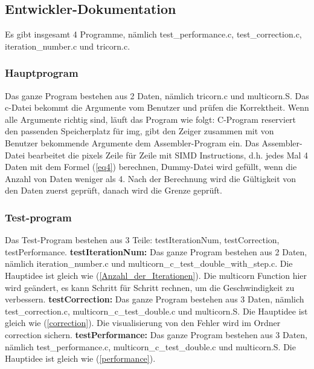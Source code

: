 \documentclass[course=erap]{aspdoc}
\begin{document}
\subsection{Entwickler-Dokumentation}
Es gibt insgesamt 4 Programme, nämlich test\_performance.c, test\_correction.c, iteration\_number.c und tricorn.c.
\subsubsection{Hauptprogram}
Das ganze Program bestehen aus 2 Daten, nämlich tricorn.c und multicorn.S. Das c-Datei bekommt die Argumente vom Benutzer und prüfen die Korrektheit. Wenn alle Argumente richtig sind, läuft das Program wie folgt: \newline
C-Program reserviert den passenden Speicherplatz für img, gibt den Zeiger zusammen mit von Benutzer bekommende Argumente dem Assembler-Program ein. Das Assembler-Datei bearbeitet die pixels Zeile für Zeile mit SIMD Instructions, d.h. jedes Mal 4 Daten mit dem Formel (\ref{eq4}) berechnen, Dummy-Datei wird gefüllt, wenn die Anzahl von Daten weniger als 4. Nach der Berechnung wird die Gültigkeit von den Daten zuerst geprüft, danach wird die Grenze geprüft.
\subsubsection{Test-program}
Das Test-Program bestehen aus 3 Teile: testIterationNum, testCorrection, testPerformance.\newline
\textbf{testIterationNum:} Das ganze Program bestehen aus 2 Daten, nämlich iteration\_number.c und multicorn\_c\_test\_double\_with\_step.c. Die Hauptidee ist gleich wie  (\ref{Anzahl_der_Iterationen}). Die multicorn Function hier wird geändert, es kann Schritt für Schritt rechnen, um die Geschwindigkeit zu verbessern. \newline
\textbf{testCorrection:} Das ganze Program bestehen aus 3 Daten, nämlich test\_correction.c, multicorn\_c\_test\_double.c und multicorn.S. Die Hauptidee ist gleich wie  (\ref{correction}). Die visualisierung von den Fehler wird im Ordner correction sichern.\newline
\textbf{testPerformance:} Das ganze Program bestehen aus 3 Daten, nämlich test\_performance.c, multicorn\_c\_test\_double.c und multicorn.S. Die Hauptidee ist gleich wie  (\ref{performance}).
\end{document}
